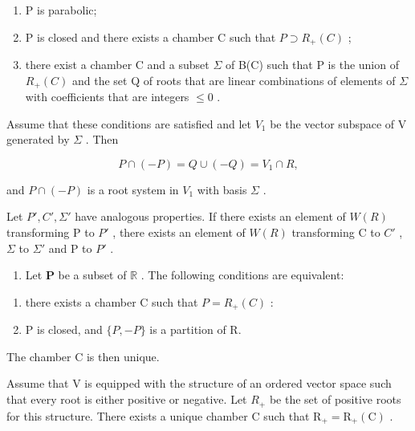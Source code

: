 \begin{enumerate}
\def\labelenumi{\alph{enumi})}
\item
  P is parabolic;
\item
  P is closed and there exists a chamber C such that \(P \supset R_{+}(C)\) ;
\item
  there exist a chamber C and a subset \(\Sigma\) of B(C) such that P is the union of \(R_{+}(C)\) and the set Q of roots that are linear combinations of elements of \(\Sigma\) with coefficients that are integers \(\leqslant 0\) .
\end{enumerate}

Assume that these conditions are satisfied and let \(V_{1}\) be the vector subspace of V generated by \(\Sigma\) . Then

\[
P \cap (- P) = Q \cup (- Q) = V _ {1} \cap R,
\]

and \(P \cap (-P)\) is a root system in \(V_1\) with basis \(\Sigma\) .

Let \(P', C', \Sigma'\) have analogous properties. If there exists an element of \(W(R)\) transforming P to \(P'\) , there exists an element of \(W(R)\) transforming C to \(C'\) , \(\Sigma\) to \(\Sigma'\) and P to \(P'\) .

\begin{enumerate}
\def\labelenumi{\arabic{enumi})}
\setcounter{enumi}{20}
\tightlist
\item
  Let \(\mathbf{P}\) be a subset of \(\mathbb{R}\) . The following conditions are equivalent:
\end{enumerate}

\begin{enumerate}
\def\labelenumi{\alph{enumi})}
\item
  there exists a chamber C such that \(P = R_{+}(C)\) :
\item
  P is closed, and \(\{P, -P\}\) is a partition of R.
\end{enumerate}

The chamber C is then unique.

Assume that V is equipped with the structure of an ordered vector space such that every root is either positive or negative. Let \(R_{+}\) be the set of positive roots for this structure. There exists a unique chamber C such that \(\mathrm{R}_{+} = \mathrm{R}_{+}(\mathrm{C})\) .

